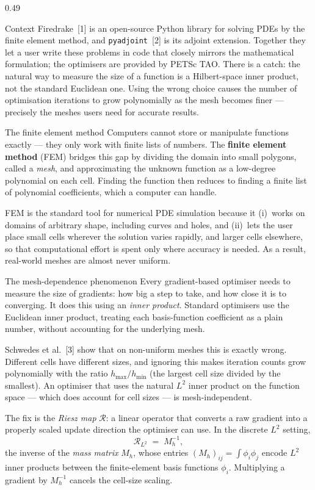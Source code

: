 \documentclass[final]{beamer}
\newcommand{\Rmap}{\mathcal{R}}
\begin{document}
\begin{frame}[t]
\begin{columns}[t,totalwidth=\dimexpr\paperwidth-3cm\relax]
\begin{column}{0.49\dimexpr\paperwidth-3cm\relax}
\begin{block}{Context}
Firedrake~[1] is an open-source Python library for solving PDEs by the finite element method, and \texttt{pyadjoint}~[2] is its adjoint extension. Together they let a user write these problems in code that closely mirrors the mathematical formulation; the optimisers are provided by PETSc TAO. There is a catch: the natural way to measure the size of a function is a Hilbert-space inner product, not the standard Euclidean one. Using the wrong choice causes the number of optimisation iterations to grow polynomially as the mesh becomes finer --- precisely the meshes users need for accurate results.
\end{block}

\begin{block}{The finite element method}
Computers cannot store or manipulate functions exactly --- they only work with finite lists of numbers. The \textbf{finite element method} (FEM) bridges this gap by dividing the domain into small polygons, called a \emph{mesh}, and approximating the unknown function as a low-degree polynomial on each cell. Finding the function then reduces to finding a finite list of polynomial coefficients, which a computer can handle.

FEM is the standard tool for numerical PDE simulation because it (i)~works on domains of arbitrary shape, including curves and holes, and (ii)~lets the user place small cells wherever the solution varies rapidly, and larger cells elsewhere, so that computational effort is spent only where accuracy is needed. As a result, real-world meshes are almost never uniform.
\end{block}


\begin{block}{The mesh-dependence phenomenon}
Every gradient-based optimiser needs to measure the size of gradients: how big a step to take, and how close it is to converging. It does this using an \emph{inner product}. Standard optimisers use the Euclidean inner product, treating each basis-function coefficient as a plain number, without accounting for the underlying mesh.

Schwedes et al.~[3] show that on non-uniform meshes this is exactly wrong. Different cells have different sizes, and ignoring this makes iteration counts grow polynomially with the ratio $h_{\max}/h_{\min}$ (the largest cell size divided by the smallest). An optimiser that uses the natural $L^{2}$ inner product on the function space --- which does account for cell sizes --- is mesh-independent.

The fix is the \emph{Riesz map} $\Rmap$: a linear operator that converts a raw gradient into a properly scaled update direction the optimiser can use. In the discrete $L^{2}$ setting,
\[
\Rmap_{L^{2}} \;=\; M_h^{-1},
\]
the inverse of the \emph{mass matrix} $M_h$, whose entries $(M_h)_{ij} = \int \phi_i\phi_j$ encode $L^{2}$ inner products between the finite-element basis functions $\phi_i$. Multiplying a gradient by $M_h^{-1}$ cancels the cell-size scaling.
\end{block}


\end{column}
\end{columns}
\end{frame}
\end{document}
